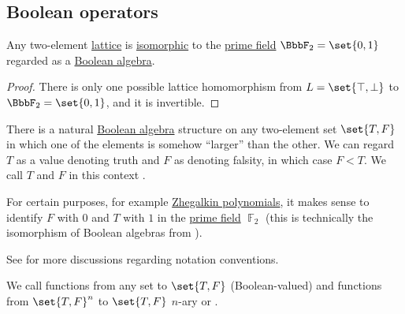 \subsection{Boolean operators}\label{subsec:boolean_operators}

\begin{proposition}\label{thm:two_element_lattice}
  Any two-element \hyperref[def:semilattice/lattice]{lattice} is \hyperref[def:semilattice/homomorphism]{isomorphic} to the \hyperref[thm:finite_fields]{prime field} \( \BbbF_2 = \set{ 0, 1 } \) regarded as a \hyperref[def:boolean_algebra]{Boolean algebra}.
\end{proposition}
\begin{proof}
  There is only one possible lattice homomorphism from \( L = \set{ \top, \bot } \) to \( \BbbF_2 = \set{ 0, 1 } \), and it is invertible.
\end{proof}

\begin{definition}\label{def:boolean_value}\mimprovised
  There is a natural \hyperref[def:boolean_algebra]{Boolean algebra} structure on any two-element set \( \set{ T, F } \) in which one of the elements is somehow \enquote{larger} than the other. We can regard \( T \) as a value denoting truth and \( F \) as denoting falsity, in which case \( F < T \). We call \( T \) and \( F \) in this context .

  For certain purposes, for example \hyperref[def:zhegalkin_polynomial]{Zhegalkin polynomials}, it makes sense to identify \( F \) with \( 0 \) and \( T \) with \( 1 \) in the \hyperref[thm:finite_fields]{prime field} \( \BbbF_2 \) (this is technically the isomorphism of Boolean algebras from ).
\end{definition}
\begin{comments}
  \item See  for more discussions regarding notation conventions.
\end{comments}

\begin{definition}\label{def:boolean_operator}
  We call functions from any set to \( \set{ T, F } \) (Boolean-valued)  and functions from \( \set{ T, F }^n \) to \( \set{ T, F } \) \( n \)-ary  or .
\end{definition}


